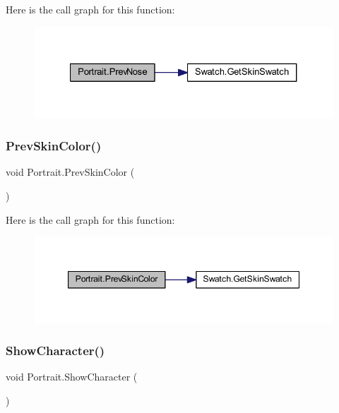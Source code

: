 Here is the call graph for this function\+:
\nopagebreak
\begin{figure}[H]
\begin{center}
\leavevmode
\includegraphics[width=327pt]{class_portrait_afc5cd84e6086e462adb30f0d988c76b6_cgraph}
\end{center}
\end{figure}
\mbox{\label{class_portrait_acbaf5360b4efe38e96ae08816ee94ccb}} 
\subsubsection{\texorpdfstring{PrevSkinColor()}{PrevSkinColor()}}
{\footnotesize\ttfamily void Portrait.\+Prev\+Skin\+Color (\begin{DoxyParamCaption}{ }\end{DoxyParamCaption})}

Here is the call graph for this function\+:
\nopagebreak
\begin{figure}[H]
\begin{center}
\leavevmode
\includegraphics[width=347pt]{class_portrait_acbaf5360b4efe38e96ae08816ee94ccb_cgraph}
\end{center}
\end{figure}
\mbox{\label{class_portrait_ab8365d52d39bacdb043a5f707e9c17ef}} 
\subsubsection{\texorpdfstring{ShowCharacter()}{ShowCharacter()}}
{\footnotesize\ttfamily void Portrait.\+Show\+Character (\begin{DoxyParamCaption}{ }\end{DoxyParamCaption})}

